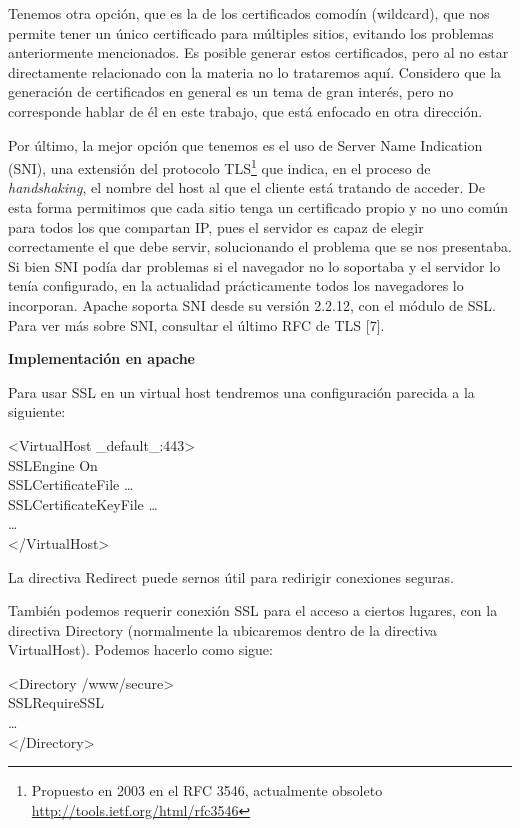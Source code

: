 \documentclass[a4paper, 10pt]{article} %
\begin{document}
Tenemos otra opción, que es la de los certificados comodín (wildcard), que nos permite tener un único certificado para múltiples sitios, evitando los problemas anteriormente mencionados. Es posible generar estos certificados, pero al no estar directamente relacionado con la materia no lo trataremos aquí. Considero que la generación de certificados en general es un tema de gran interés, pero no corresponde hablar de él en este trabajo, que está enfocado en otra dirección.

Por último, la mejor opción que tenemos es el uso de Server Name Indication (SNI), una extensión del protocolo TLS\footnote{Propuesto en 2003 en el RFC 3546, actualmente obsoleto \url{http://tools.ietf.org/html/rfc3546}} que indica, en el proceso de \textit{handshaking}, el nombre del host al que el cliente está tratando de acceder. De esta forma permitimos que cada sitio tenga un certificado propio y no uno común para todos los que compartan IP, pues el servidor es capaz de elegir correctamente el que debe servir, solucionando el problema que se nos presentaba. Si bien SNI podía dar problemas si el navegador no lo soportaba y el servidor lo tenía configurado, en la actualidad prácticamente todos los navegadores lo incorporan. Apache soporta SNI desde su versión 2.2.12, con el módulo de SSL. \\
Para ver más sobre SNI, consultar el último RFC de TLS [7].

\textbf{Implementación en apache}

Para usar SSL en un virtual host tendremos una configuración parecida a la siguiente: 

<VirtualHost \_default\_:443>\\
	SSLEngine On\\
	SSLCertificateFile    \dots\\
	SSLCertificateKeyFile \dots\\
	\dots\\
</VirtualHost> 

La directiva Redirect puede sernos útil para redirigir conexiones seguras. 

También podemos requerir conexión SSL para el acceso a ciertos lugares, con la directiva Directory (normalmente la ubicaremos dentro de la directiva VirtualHost). Podemos hacerlo como sigue:

<Directory /www/secure>\\
	SSLRequireSSL\\
	\dots\\
</Directory>
\end{document}
